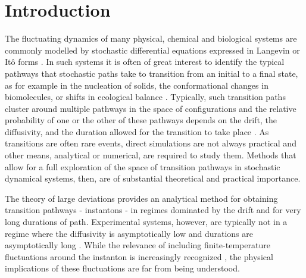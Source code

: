 \section{Introduction}


The fluctuating dynamics of many physical, chemical and biological
systems are commonly modelled by stochastic differential equations
expressed in Langevin or Itô forms \citep{kampenStochasticProcessesPhysics2011,gardinerStochasticMethodsHandbook2010,riskenFokkerPlanckEquationMethods2012,bharucha-reidElementsTheoryMarkov2012}.
In such systems it is often of great interest to identify the typical
pathways that stochastic paths take to transition from an initial
to a final state, as for example in the nucleation of solids, the
conformational changes in biomolecules, or shifts in ecological balance
\citep{faccioliDominantPathwaysProtein2006, demarcoPhaseTransitionModel2001, gardnerConstructionGeneticToggle2000, mangelBarrierTransitionsDriven1994, wolynesNavigatingFoldingRoutes1995, huangMolecularMathematicalBasis2012, paninskiMostLikelyVoltage2006, noltingBallsCupsQuasipotentials2016, leeFindingMultipleReaction2017}.
Typically, such transition paths cluster around multiple pathways
in the space of configurations and the relative probability of one
or the other of these pathways depends on the drift, the diffusivity,
and the duration allowed for the transition to take place \citep{onsagerFluctuationsIrreversibleProcesses1953,bachFunctionalsPathsDiffusion1977,itoProbabilisticConstructionLagrangean1978,ikedaStochasticDifferentialEquations2014}.
As transitions are often rare events, direct simulations are not always
practical and other means, analytical or numerical, are required to
study them. Methods that allow for a full exploration of the space
of transition pathways in stochastic dynamical systems, then, are
of substantial theoretical and practical importance.

The theory of large deviations \citep{ventselSMALLRANDOMPERTURBATIONS1970,stratonovichMarkovMethodsTheory1989,grahamMacroscopicPotentialsBifurcations1989,arnoldStochasticDifferentialEquations1974}
provides an analytical method for obtaining transition pathways -
instantons - in regimes dominated by the drift and for very long durations
of path. Experimental systems, however, are typically not in a regime
where the diffusivity is asymptotically low and durations are asymptotically
long \citep{gladrowExperimentalMeasurementRelative2021}. While the
relevance of including finite-temperature fluctuations around the
instanton \citep{gelfandIntegrationFunctionalSpaces1960} is increasingly
recognized \citep{nickelsen_noise_2022,corazza_normalized_2020,lu_gaussian_2017},
the physical implications of these fluctuations are far from being
understood.

